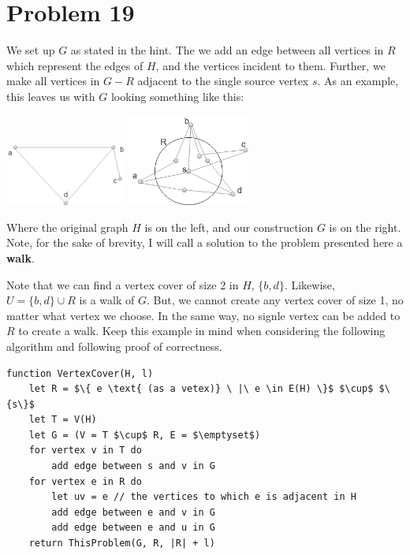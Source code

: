 \documentclass{article}
\providecommand{\prob}[1]{\section*{Problem #1}}
\begin{document}
\pagebreak
\prob{19}

We set up $G$ as stated in the hint.
The we add an edge between all vertices in $R$ which represent the edges of $H$, and the vertices incident to them.
Further, we make all vertices in $G - R$ adjacent to the single source vertex $s$.
As an example, this leaves us with $G$ looking something like this:

\begin{center}
    \includegraphics[width=0.3\textwidth]{a21p19first}
    \includegraphics[width=0.3\textwidth]{a21p19graph}
\end{center}

Where the original graph $H$ is on the left, and our construction $G$ is on the right. Note, for the sake of brevity, I will call a solution to the problem presented here a \textbf{walk}.

Note that we can find a vertex cover of size 2 in $H$, $\{b, d\}$.
Likewise, $U = \{b, d\} \cup R$ is a walk of $G$.
But, we cannot create any vertex cover of size 1, no matter what vertex we choose.
In the same way, no signle vertex can be added to $R$ to create a walk.
Keep this example in mind when considering the following algorithm and following proof of correctness.

\begin{lstlisting}
function VertexCover(H, l)
    let R = $\{ e \text{ (as a vetex)} \ |\ e \in E(H) \}$ $\cup$ $\{s\}$
    let T = V(H)
    let G = (V = T $\cup$ R, E = $\emptyset$)
    for vertex v in T do
        add edge between s and v in G
    for vertex e in R do
        let uv = e // the vertices to which e is adjacent in H
        add edge between e and v in G
        add edge between e and u in G
    return ThisProblem(G, R, |R| + l)
\end{lstlisting}
\end{document}
